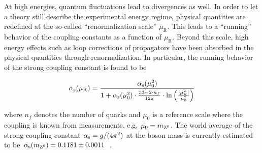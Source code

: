 

At high energies, quantum fluctuations lead to divergences as well. In order to let a theory still describe the experimental energy regime, physical quantities are redefined at the so-called ``renormalization scale'' $\mu_\mathrm{R}$. This leads to a ``running'' behavior of the coupling constants as a function of $\mu_\mathrm{R}$. Beyond this scale, high energy effects such as loop corrections of propagators have been absorbed in the physical quantities through renormalization. In particular, the running behavior of the strong coupling constant is found to be 

\begin{equation}
{\alpha_\mathrm{s}}(\mu_\mathrm{R})=\frac{{\alpha_\mathrm{s}}(\mu_{0}^{2})}{1+{\alpha_\mathrm{s}}(\mu_\mathrm{0}^2)\cdot\tfrac{33-2\cdot n_f}{12\pi}\cdot\ln\Big(\tfrac{|\mu_\mathrm{R}^2|}{\mu_{0}^{2}}\Big)}
\end{equation}

where $n_f$ denotes the number of quarks and $\mu_{0}$ is a reference scale where the coupling is known from measurements, e.g. $\mu_{0}=m_{{\mathrm{Z}^{0}}}$. The world average of the strong coupling constant ${\alpha_\mathrm{s}}=g/(4\pi^2)$ at the \zboson boson mass is currently estimated to be ${\alpha_\mathrm{s}}(m_{{\mathrm{Z}^{0}}})=0.1181\pm0.0011$~\cite{Olive:2016xmw}. 

